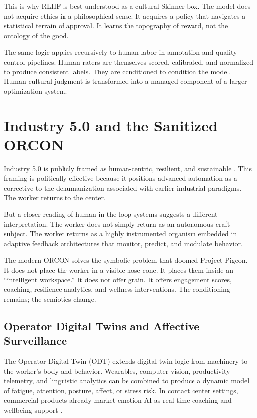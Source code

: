 \documentclass[runningheads]{llncs}
\begin{document}
This is why RLHF is best understood as a cultural Skinner box. The model does not acquire ethics in a philosophical sense. It acquires a policy that navigates a statistical terrain of approval. It learns the topography of reward, not the ontology of the good.

The same logic applies recursively to human labor in annotation and quality control pipelines. Human raters are themselves scored, calibrated, and normalized to produce consistent labels. They are conditioned to condition the model. Human cultural judgment is transformed into a managed component of a larger optimization system.

\section{Industry 5.0 and the Sanitized ORCON}

Industry 5.0 is publicly framed as human-centric, resilient, and sustainable \cite{breque2021industry}. This framing is politically effective because it positions advanced automation as a corrective to the dehumanization associated with earlier industrial paradigms. The worker returns to the center.

But a closer reading of human-in-the-loop systems suggests a different interpretation. The worker does not simply return as an autonomous craft subject. The worker returns as a highly instrumented organism embedded in adaptive feedback architectures that monitor, predict, and modulate behavior.

The modern ORCON solves the symbolic problem that doomed Project Pigeon. It does not place the worker in a visible nose cone. It places them inside an ``intelligent workspace.'' It does not offer grain. It offers engagement scores, coaching, resilience analytics, and wellness interventions. The conditioning remains; the semiotics change.

\subsection{Operator Digital Twins and Affective Surveillance}

The Operator Digital Twin (ODT) extends digital-twin logic from machinery to the worker's body and behavior. Wearables, computer vision, productivity telemetry, and linguistic analytics can be combined to produce a dynamic model of fatigue, attention, posture, affect, or stress risk. In contact center settings, commercial products already market emotion AI as real-time coaching and wellbeing support \cite{cxtoday2022cogito}.
\end{document}
